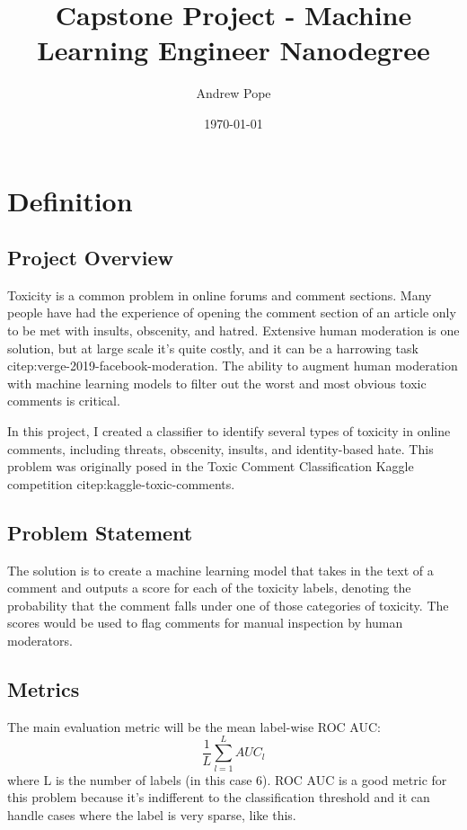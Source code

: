 \documentclass[12pt]{article}
\author{Andrew Pope}
\date{\today}
\title{Capstone Project - Machine Learning Engineer Nanodegree}
\begin{document}
\maketitle

\section*{Definition}
\label{sec:orgdc365d1}

\subsection*{Project Overview}
\label{sec:org2c3a54a}
Toxicity is a common problem in online forums and comment sections. Many people have had the experience of opening the comment section of an article only to be met with insults, obscenity, and hatred. Extensive human moderation is one solution, but at large scale it's quite costly, and it can be a harrowing task citep:verge-2019-facebook-moderation. The ability to augment human moderation with machine learning models to filter out the worst and most obvious toxic comments is critical.

In this project, I created a classifier to identify several types of toxicity in online comments, including threats, obscenity, insults, and identity-based hate. This problem was originally posed in the Toxic Comment Classification Kaggle competition citep:kaggle-toxic-comments. 
\subsection*{Problem Statement}
\label{sec:org0a10041}
The solution is to create a machine learning model that takes in the text of a comment and outputs a score for each of the toxicity labels, denoting the probability that the comment falls under one of those categories of toxicity. The scores would be used to flag comments for manual inspection by human moderators.
\subsection*{Metrics}
\label{sec:orgb3c0f42}
The main evaluation metric will be the mean label-wise ROC AUC:
\begin{equation}
\frac{1}{L} \sum_{l=1}^{L} AUC_{l}
\end{equation}
where L is the number of labels (in this case 6). ROC AUC is a good metric for this problem because it's indifferent to the classification threshold and it can handle cases where the label is very sparse, like this.
\end{document}
